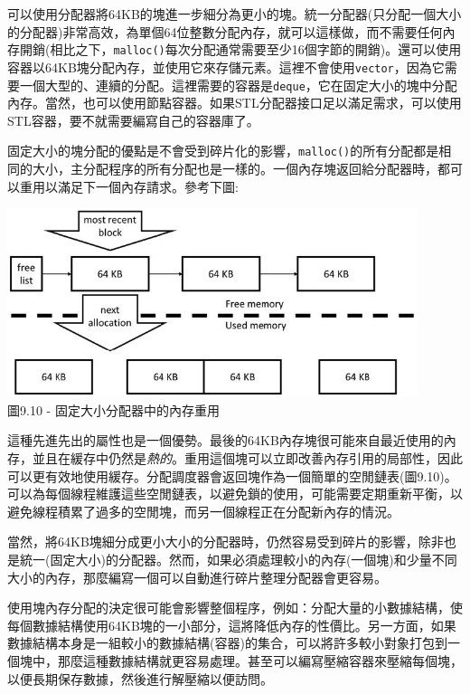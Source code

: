 可以使用分配器將64KB的塊進一步細分為更小的塊。統一分配器(只分配一個大小的分配器)非常高效，為單個64位整數分配內存，就可以這樣做，而不需要任何內存開銷(相比之下，\texttt{malloc()}每次分配通常需要至少16個字節的開銷)。還可以使用容器以64KB塊分配內存，並使用它來存儲元素。這裡不會使用\texttt{vector}，因為它需要一個大型的、連續的分配。這裡需要的容器是\texttt{deque}，它在固定大小的塊中分配內存。當然，也可以使用節點容器。如果STL分配器接口足以滿足需求，可以使用STL容器，要不就需要編寫自己的容器庫了。

固定大小的塊分配的優點是不會受到碎片化的影響，\texttt{malloc()}的所有分配都是相同的大小，主分配程序的所有分配也是一樣的。一個內存塊返回給分配器時，都可以重用以滿足下一個內存請求。參考下圖:

\begin{center}
\includegraphics[width=0.9\textwidth]{content/3/chapter9/images/10.jpg}\\
圖9.10 - 固定大小分配器中的內存重用
\end{center}

這種先進先出的屬性也是一個優勢。最後的64KB內存塊很可能來自最近使用的內存，並且在緩存中仍然是\textit{熱的}。重用這個塊可以立即改善內存引用的局部性，因此可以更有效地使用緩存。分配調度器會返回塊作為一個簡單的空閒鏈表(圖9.10)。可以為每個線程維護這些空閒鏈表，以避免鎖的使用，可能需要定期重新平衡，以避免線程積累了過多的空閒塊，而另一個線程正在分配新內存的情況。

當然，將64KB塊細分成更小大小的分配器時，仍然容易受到碎片的影響，除非也是統一(固定大小)的分配器。然而，如果必須處理較小的內存(一個塊)和少量不同大小的內存，那麼編寫一個可以自動進行碎片整理分配器會更容易。 

使用塊內存分配的決定很可能會影響整個程序，例如：分配大量的小數據結構，使每個數據結構使用64KB塊的一小部分，這將降低內存的性價比。另一方面，如果數據結構本身是一組較小的數據結構(容器)的集合，可以將許多較小對象打包到一個塊中，那麼這種數據結構就更容易處理。甚至可以編寫壓縮容器來壓縮每個塊，以便長期保存數據，然後進行解壓縮以便訪問。 

